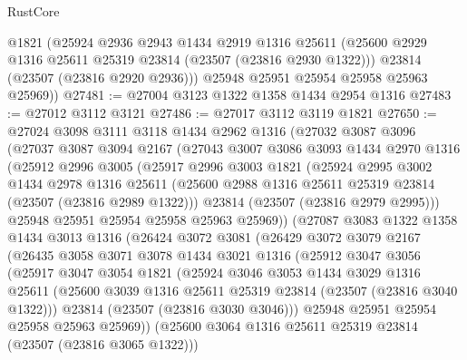 \begin{lexlean}{RustCore}
\begin{coremodule}
        @1821
        (@25924
          @2936
          @2943
          @1434
          @2919
          @1316
          @25611
          (@25600 @2929 @1316 @25611 @25319 @23814 (@23507 (@23816 @2930 @1322)))
          @23814
          (@23507 (@23816 @2920 @2936)))
        @25948
        @25951
        @25954
        @25958
        @25963
        @25969))
@27481 := @27004 @3123 @1322 @1358 @1434 @2954 @1316
@27483 := @27012 @3112 @3121
@27486 := @27017 @3112 @3119 @1821
@27650 := @27024
    @3098
    @3111
    @3118
    @1434
    @2962
    @1316
    (@27032
      @3087
      @3096
      (@27037
        @3087
        @3094
        @2167
        (@27043
          @3007
          @3086
          @3093
          @1434
          @2970
          @1316
          (@25912
            @2996
            @3005
            (@25917
              @2996
              @3003
              @1821
              (@25924
                @2995
                @3002
                @1434
                @2978
                @1316
                @25611
                (@25600 @2988 @1316 @25611 @25319 @23814 (@23507 (@23816 @2989 @1322)))
                @23814
                (@23507 (@23816 @2979 @2995)))
              @25948
              @25951
              @25954
              @25958
              @25963
              @25969))
          (@27087
            @3083
            @1322
            @1358
            @1434
            @3013
            @1316
            (@26424
              @3072
              @3081
              (@26429
                @3072
                @3079
                @2167
                (@26435
                  @3058
                  @3071
                  @3078
                  @1434
                  @3021
                  @1316
                  (@25912
                    @3047
                    @3056
                    (@25917
                      @3047
                      @3054
                      @1821
                      (@25924
                        @3046
                        @3053
                        @1434
                        @3029
                        @1316
                        @25611
                        (@25600 @3039 @1316 @25611 @25319 @23814 (@23507 (@23816 @3040 @1322)))
                        @23814
                        (@23507 (@23816 @3030 @3046)))
                      @25948
                      @25951
                      @25954
                      @25958
                      @25963
                      @25969))
                  (@25600 @3064 @1316 @25611 @25319 @23814 (@23507 (@23816 @3065 @1322)))

\end{coremodule}
\end{lexlean}
